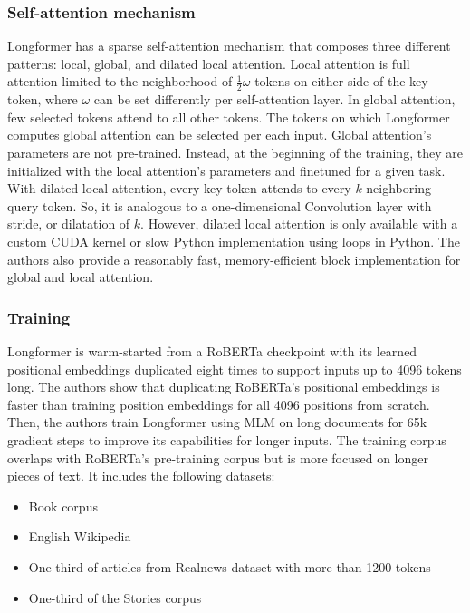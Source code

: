 \subsubsection{Self-attention mechanism}

Longformer has a sparse self-attention mechanism that composes three different
patterns: local, global, and dilated local attention. Local attention is
full attention limited to the neighborhood of $\frac{1}{2}\omega$ tokens
on either side of the key token, where $\omega$ can be set differently per
self-attention layer. In global attention, few selected tokens attend to all
other tokens. The tokens on which Longformer computes global attention can be
selected per each input. Global attention's parameters are not pre-trained.
Instead, at the beginning of the training, they are initialized with the
local attention's parameters and finetuned for a given task. With dilated
local attention, every key token attends to every $k$ neighboring query token.
So, it is analogous to a one-dimensional Convolution layer
\citep{van2016wavenet} with stride, or dilatation of $k$. However, dilated local attention is only available
with a custom CUDA kernel or slow Python implementation using loops in Python. The authors also provide a reasonably fast, memory-efficient block implementation for global and local
attention.

\subsubsection{Training}

Longformer is warm-started from a RoBERTa \citep{liu2019roberta} checkpoint
with its learned positional embeddings duplicated eight times to support inputs
up to 4096 tokens long. The authors show that duplicating RoBERTa's positional
embeddings is faster than training position embeddings for all 4096 positions
from scratch. Then, the authors train Longformer using MLM on long documents
for 65k gradient steps to improve its capabilities for longer inputs. The
training corpus overlaps with RoBERTa's pre-training corpus but is more focused
on longer pieces of text. It includes the following datasets:

\begin{itemize}

  \item Book corpus \citep{zhu2015aligning}

  \item English Wikipedia

  \item One-third of articles from Realnews dataset \citep{zellers2019defending}
      with more than 1200 tokens

  \item One-third of the Stories corpus \citep{trinh2018simple}

\end{itemize}

